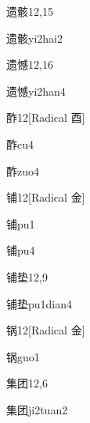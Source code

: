 \begin{entry}{遗骸}{12,15}
  \begin{phonetics}{遗骸}{yi2hai2}
  \end{phonetics}
\end{entry}

\begin{entry}{遗憾}{12,16}
  \begin{phonetics}{遗憾}{yi2han4}
  \end{phonetics}
\end{entry}

\begin{entry}{酢}{12}[Radical 酉]
  \begin{phonetics}{酢}{cu4}
  \end{phonetics}
  \begin{phonetics}{酢}{zuo4}
  \end{phonetics}
\end{entry}

\begin{entry}{铺}{12}[Radical 金]
  \begin{phonetics}{铺}{pu1}
  \end{phonetics}
  \begin{phonetics}{铺}{pu4}
  \end{phonetics}
\end{entry}

\begin{entry}{铺垫}{12,9}
  \begin{phonetics}{铺垫}{pu1dian4}
  \end{phonetics}
\end{entry}

\begin{entry}{锅}{12}[Radical 金]
  \begin{phonetics}{锅}{guo1}
  \end{phonetics}
\end{entry}

\begin{entry}{集团}{12,6}
  \begin{phonetics}{集团}{ji2tuan2}
  \end{phonetics}
\end{entry}

